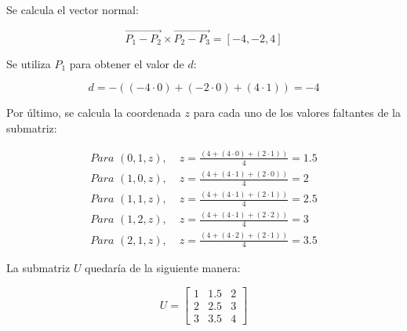 \documentclass[12pt,a4paper]{article}
\begin{document}
Se calcula el vector normal:

\[
\vec{P_1 - P_2} \times \vec{P_2 - P_3} = [-4,-2,4]
\]

Se utiliza $P_1$ para obtener el valor de $d$:

\[
d = -((-4 \cdot 0) + (-2\cdot 0) + (4\cdot 1)) = -4
\]

Por último, se calcula la coordenada $z$ para cada uno de los valores faltantes de la submatriz:

\begin{align*}
\textit{Para } (0,1,z), \; & z = \frac{(4 + (4 \cdot 0) + (2 \cdot 1))}{4} = 1.5 \\[6pt]
\textit{Para } (1,0,z), \; & z = \frac{(4 + (4 \cdot 1) + (2 \cdot 0))}{4} = 2 \\[6pt]
\textit{Para } (1,1,z), \; & z = \frac{(4 + (4 \cdot 1) + (2 \cdot 1))}{4} = 2.5 \\[6pt]
\textit{Para } (1,2,z), \; & z = \frac{(4 + (4 \cdot 1) + (2 \cdot 2))}{4} = 3 \\[6pt]
\textit{Para } (2,1,z), \; & z = \frac{(4 + (4 \cdot 2) + (2 \cdot 1))}{4} = 3.5
\end{align*}

La submatriz $U$ quedaría de la siguiente manera:

\[
U =
    \begin{bmatrix}
    1 & 1.5 & 2 \\
    2 & 2.5 & 3 \\
    3 & 3.5 & 4
    \end{bmatrix}
\]
\end{document}
